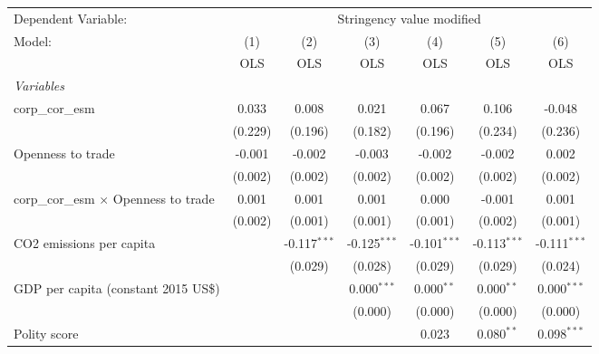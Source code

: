 
\begingroup
\centering
\begin{tabular}{lcccccc}
   \toprule
   Dependent Variable: & \multicolumn{6}{c}{Stringency value modified}\\
   Model:                                       & (1)     & (2)            & (3)            & (4)            & (5)            & (6)\\  
                                                &  OLS    & OLS            & OLS            & OLS            & OLS            & OLS\\  
   \midrule
   \emph{Variables}\\
   corp\_cor\_esm                               & 0.033   & 0.008          & 0.021          & 0.067          & 0.106          & -0.048\\   
                                                & (0.229) & (0.196)        & (0.182)        & (0.196)        & (0.234)        & (0.236)\\   
   Openness to trade                            & -0.001  & -0.002         & -0.003         & -0.002         & -0.002         & 0.002\\   
                                                & (0.002) & (0.002)        & (0.002)        & (0.002)        & (0.002)        & (0.002)\\   
   corp\_cor\_esm $\times$ Openness to trade    & 0.001   & 0.001          & 0.001          & 0.000          & -0.001         & 0.001\\   
                                                & (0.002) & (0.001)        & (0.001)        & (0.001)        & (0.002)        & (0.001)\\   
   CO2 emissions per capita                     &         & -0.117$^{***}$ & -0.125$^{***}$ & -0.101$^{***}$ & -0.113$^{***}$ & -0.111$^{***}$\\   
                                                &         & (0.029)        & (0.028)        & (0.029)        & (0.029)        & (0.024)\\   
   GDP per capita (constant 2015 US\$)          &         &                & 0.000$^{***}$  & 0.000$^{**}$   & 0.000$^{**}$   & 0.000$^{***}$\\   
                                                &         &                & (0.000)        & (0.000)        & (0.000)        & (0.000)\\   
   Polity score                                 &         &                &                & 0.023          & 0.080$^{**}$   & 0.098$^{***}$\\   

\end{tabular}
